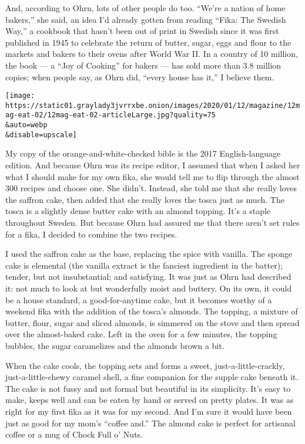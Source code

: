 And, according to Ohrn, lots of other people do too. ``We're a nation of
home bakers,'' she said, an idea I'd already gotten from reading ``Fika:
The Swedish Way,'' a cookbook that hasn't been out of print in Swedish
since it was first published in 1945 to celebrate the return of butter,
sugar, eggs and flour to the markets and bakers to their ovens after
World War II. In a country of 10 million, the book --- a ``Joy of
Cooking'' for bakers --- has sold more than 3.8 million copies; when
people say, as Ohrn did, ``every house has it,'' I believe them.

\texttt{[image: https://static01.graylady3jvrrxbe.onion/images/2020/01/12/magazine/12mag-eat-02/12mag-eat-02-articleLarge.jpg?quality=75\\\&auto=webp\\\&disable=upscale]}

My copy of the orange-and-white-checked bible is the 2017
English-language edition. And because Ohrn was its recipe editor, I
assumed that when I asked her what I should make for my own fika, she
would tell me to flip through the almost 300 recipes and choose one. She
didn't. Instead, she told me that she really loves the saffron cake,
then added that she really loves the tosca just as much. The tosca is a
slightly dense butter cake with an almond topping. It's a staple
throughout Sweden. But because Ohrn had assured me that there aren't set
rules for a fika, I decided to combine the two recipes.

I used the saffron cake as the base, replacing the spice with vanilla.
The sponge cake is elemental (the vanilla extract is the fanciest
ingredient in the batter); tender, but not insubstantial; and
satisfying. It was just as Ohrn had described it: not much to look at
but wonderfully moist and buttery. On its own, it could be a house
standard, a good-for-anytime cake, but it becomes worthy of a weekend
fika with the addition of the tosca's almonds. The topping, a mixture of
butter, flour, sugar and sliced almonds, is simmered on the stove and
then spread over the almost-baked cake. Left in the oven for a few
minutes, the topping bubbles, the sugar caramelizes and the almonds
brown a bit.

When the cake cools, the topping sets and forms a sweet,
just-a-little-crackly, just-a-little-chewy caramel shell, a fine
companion for the supple cake beneath it. The cake is not fussy and not
formal but beautiful in its simplicity. It's easy to make, keeps well
and can be eaten by hand or served on pretty plates. It was as right for
my first fika as it was for my second. And I'm sure it would have been
just as good for my mom's ``coffee and.'' The almond cake is perfect for
artisanal coffee or a mug of Chock Full o' Nuts.

